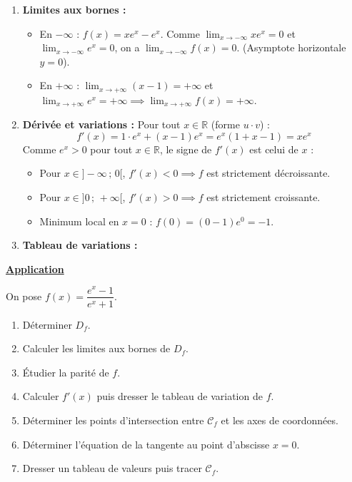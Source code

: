 \documentclass[12pt,a4paper]{article}
\begin{document}
\begin{enumerate}
    \item \textbf{Limites aux bornes :}
    \begin{itemize}
        \item En $-\infty$ : $f(x) = x e^x - e^x$. 
        Comme $\lim_{x \to -\infty} x e^x = 0$ et $\lim_{x \to -\infty} e^x = 0$, on a $\lim_{x \to -\infty} f(x) = 0$. (Asymptote horizontale $y = 0$).
        \item En $+\infty$ : $\lim_{x \to +\infty} (x - 1) = +\infty$ et $\lim_{x \to +\infty} e^x = +\infty \implies \lim_{x \to +\infty} f(x) = +\infty$.
    \end{itemize}

    \item \textbf{Dérivée et variations :}
    Pour tout $x \in \mathbb{R}$ (forme $u \cdot v$) :
    \[
    f'(x) = 1 \cdot e^x + (x - 1)e^x = e^x(1 + x - 1) = x e^x
    \]
    Comme $e^x > 0$ pour tout $x \in \mathbb{R}$, le signe de $f'(x)$ est celui de $x$ :
    \begin{itemize}
        \item Pour $x \in ]-\infty \,;\, 0[$, $f'(x) < 0 \implies f$ est strictement décroissante.
        \item Pour $x \in ]0 \,;\, +\infty[$, $f'(x) > 0 \implies f$ est strictement croissante.
        \item Minimum local en $x = 0$ : $f(0) = (0 - 1)e^0 = -1$.
    \end{itemize}

    \item \textbf{Tableau de variations :}
    \begin{center}
    \end{center}
\end{enumerate}

\vspace{0.4cm}

\underline{\textbf{Application}}

\vspace{0.3cm}

On pose $f(x) = \dfrac{e^x - 1}{e^x + 1}$.

\begin{enumerate}
    \item Déterminer $D_f$.
    \item Calculer les limites aux bornes de $D_f$.
    \item Étudier la parité de $f$.
    \item Calculer $f'(x)$ puis dresser le tableau de variation de $f$.
    \item Déterminer les points d'intersection entre $\mathcal{C}_f$ et les axes de coordonnées.
    \item Déterminer l'équation de la tangente au point d'abscisse $x = 0$.
    \item Dresser un tableau de valeurs puis tracer $\mathcal{C}_f$.
\end{enumerate}
\end{document}
